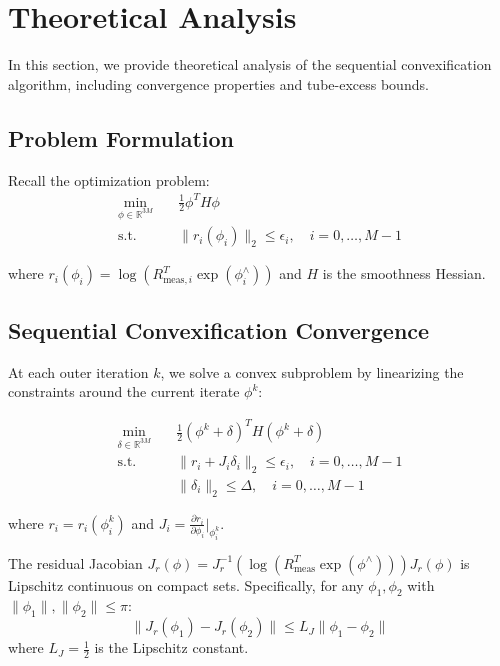 \section{Theoretical Analysis}

In this section, we provide theoretical analysis of the sequential convexification algorithm, including convergence properties and tube-excess bounds.

\subsection{Problem Formulation}

Recall the optimization problem:
\begin{align}
\min_{\phi \in \mathbb{R}^{3M}} \quad & \frac{1}{2} \phi^T H \phi \\
\text{s.t.} \quad & \|r_i(\phi_i)\|_2 \leq \epsilon_i, \quad i = 0, \ldots, M-1 \nonumber
\end{align}

where $r_i(\phi_i) = \log(R_{\text{meas},i}^T \exp(\phi_i^\wedge))$ and $H$ is the smoothness Hessian.

\subsection{Sequential Convexification Convergence}

At each outer iteration $k$, we solve a convex subproblem by linearizing the constraints around the current iterate $\phi^k$:

\begin{align}
\min_{\delta \in \mathbb{R}^{3M}} \quad & \frac{1}{2} (\phi^k + \delta)^T H (\phi^k + \delta) \\
\text{s.t.} \quad & \|r_i + J_i \delta_i\|_2 \leq \epsilon_i, \quad i = 0, \ldots, M-1 \nonumber \\
& \|\delta_i\|_2 \leq \Delta, \quad i = 0, \ldots, M-1 \nonumber
\end{align}

where $r_i = r_i(\phi_i^k)$ and $J_i = \frac{\partial r_i}{\partial \phi_i}\big|_{\phi_i^k}$.

\begin{lemma}
The residual Jacobian $J_r(\phi) = J_r^{-1}(\log(R_{\text{meas}}^T \exp(\phi^\wedge))) J_r(\phi)$ is Lipschitz continuous on compact sets. Specifically, for any $\phi_1, \phi_2$ with $\|\phi_1\|, \|\phi_2\| \leq \pi$:
\begin{equation}
\|J_r(\phi_1) - J_r(\phi_2)\| \leq L_J \|\phi_1 - \phi_2\|
\end{equation}
where $L_J = \frac{1}{2}$ is the Lipschitz constant.
\end{lemma}

